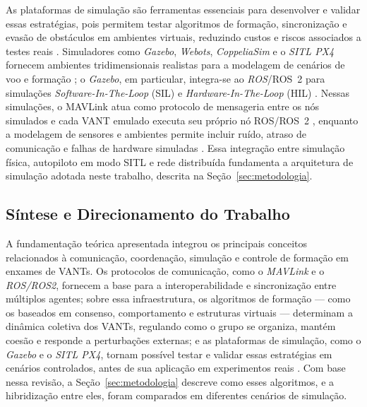 As plataformas de simulação são ferramentas essenciais para desenvolver e validar essas estratégias, pois permitem testar algoritmos de formação, sincronização e evasão de obstáculos em ambientes virtuais, reduzindo custos e riscos associados a testes reais \citep{khaliq2021, ziming2023}. Simuladores como \textit{Gazebo}, \textit{Webots}, \textit{CoppeliaSim} e o \textit{SITL PX4} fornecem ambientes tridimensionais realistas para a modelagem de cenários de voo e formação \citep{ziming2023}; o \textit{Gazebo}, em particular, integra-se ao \textit{ROS}/ROS~2 para simulações \textit{Software-In-The-Loop} (SIL) e \textit{Hardware-In-The-Loop} (HIL) \citep{khaliq2021}. Nessas simulações, o MAVLink atua como protocolo de mensageria entre os nós simulados e cada VANT emulado executa seu próprio nó ROS/ROS~2 \citep{khaliq2021, ROS2Design2022}, enquanto a modelagem de sensores e ambientes permite incluir ruído, atraso de comunicação e falhas de hardware simuladas \citep{ziming2023, PX4SITL2024}. Essa integração entre simulação física, autopiloto em modo SITL e rede distribuída fundamenta a arquitetura de simulação adotada neste trabalho, descrita na Seção~\ref{sec:metodologia}.

\subsection{Síntese e Direcionamento do Trabalho}

A fundamentação teórica apresentada integrou os principais conceitos relacionados à comunicação, coordenação, simulação e controle de formação em enxames de VANTs. Os protocolos de comunicação, como o \textit{MAVLink} e o \textit{ROS/ROS2}, fornecem a base para a interoperabilidade e sincronização entre múltiplos agentes; sobre essa infraestrutura, os algoritmos de formação --- como os baseados em consenso, comportamento e estruturas virtuais --- determinam a dinâmica coletiva dos VANTs, regulando como o grupo se organiza, mantém coesão e responde a perturbações externas; e as plataformas de simulação, como o \textit{Gazebo} e o \textit{SITL PX4}, tornam possível testar e validar essas estratégias em cenários controlados, antes de sua aplicação em experimentos reais \citep{ouyang2023formation, bu2024advancement, khaliq2021}. Com base nessa revisão, a Seção~\ref{sec:metodologia} descreve como esses algoritmos, e a hibridização entre eles, foram comparados em diferentes cenários de simulação.

